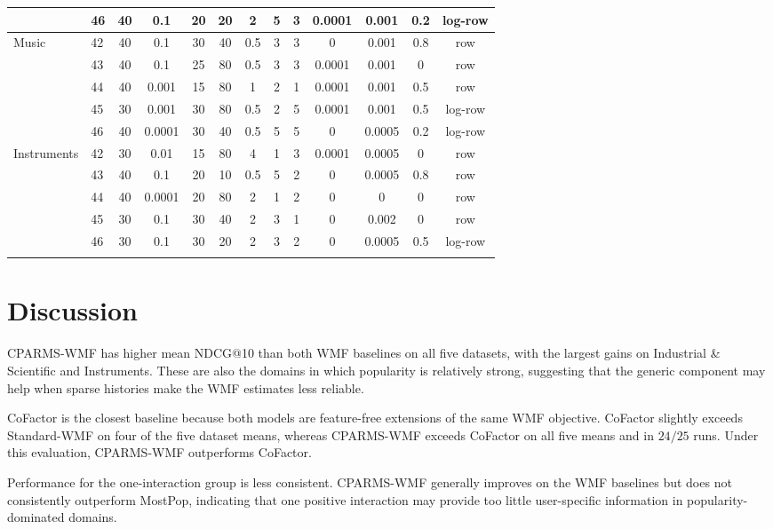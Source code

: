 \documentclass[pdflatex,sn-vancouver-num]{sn-jnl}%
\theoremstyle{thmstyleone}%
\theoremstyle{thmstyletwo}%
\theoremstyle{thmstylethree}%
\begin{document}
\begin{table}
\begin{tabular*}{\textheight}{@{\extracolsep{\fill}}llccccccccccc@{}}
  & 46 & 40 & 0.1 & 20 & 20 & 2 & 5 & 3 & 0.0001 & 0.001 & 0.2 & log-row \\
\midrule
Music & 42 & 40 & 0.1 & 30 & 40 & 0.5 & 3 & 3 & 0 & 0.001 & 0.8 & row \\
  & 43 & 40 & 0.1 & 25 & 80 & 0.5 & 3 & 3 & 0.0001 & 0.001 & 0 & row \\
  & 44 & 40 & 0.001 & 15 & 80 & 1 & 2 & 1 & 0.0001 & 0.001 & 0.5 & row \\
  & 45 & 30 & 0.001 & 30 & 80 & 0.5 & 2 & 5 & 0.0001 & 0.001 & 0.5 & log-row \\
  & 46 & 40 & 0.0001 & 30 & 40 & 0.5 & 5 & 5 & 0 & 0.0005 & 0.2 & log-row \\
\midrule
Instruments & 42 & 30 & 0.01 & 15 & 80 & 4 & 1 & 3 & 0.0001 & 0.0005 & 0 & row \\
  & 43 & 40 & 0.1 & 20 & 10 & 0.5 & 5 & 2 & 0 & 0.0005 & 0.8 & row \\
  & 44 & 40 & 0.0001 & 20 & 80 & 2 & 1 & 2 & 0 & 0 & 0 & row \\
  & 45 & 30 & 0.1 & 30 & 40 & 2 & 3 & 1 & 0 & 0.002 & 0 & row \\
  & 46 & 30 & 0.1 & 30 & 20 & 2 & 3 & 2 & 0 & 0.0005 & 0.5 & log-row \\
\botrule
\end{tabular*}
\end{table}

\clearpage



\section{Discussion}\label{sec6}

CPARMS-WMF has higher mean NDCG@10 than both WMF baselines on all five datasets, with the largest gains on Industrial \& Scientific and Instruments. These are also the domains in which popularity is relatively strong, suggesting that the generic component may help when sparse histories make the WMF estimates less reliable.

CoFactor is the closest baseline because both models are feature-free extensions of the same WMF objective. CoFactor slightly exceeds Standard-WMF on four of the five dataset means, whereas CPARMS-WMF exceeds CoFactor on all five means and in $24/25$ runs. Under this evaluation, CPARMS-WMF outperforms CoFactor.

Performance for the one-interaction group is less consistent. CPARMS-WMF generally improves on the WMF baselines but does not consistently outperform MostPop, indicating that one positive interaction may provide too little user-specific information in popularity-dominated domains.
\end{document}
